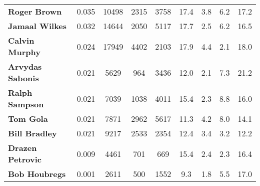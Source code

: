\documentclass[paper=a4, fontsize=11pt]{scrartcl} %
\numberwithin{equation}{section} %
\numberwithin{figure}{section} %
\numberwithin{table}{section} %
\begin{document}
\begin{table}[thb]
\begin{tabular}{l*{7}{c}r}
\textbf{Roger Brown} & 0.035 & 10498 & 2315 & 3758 & 17.4 & 3.8 & 6.2 & 17.2 \\
\textbf{Jamaal Wilkes} & 0.032 & 14644 & 2050 & 5117 & 17.7 & 2.5 & 6.2 & 16.5 \\
\textbf{Calvin Murphy} & 0.024 & 17949 & 4402 & 2103 & 17.9 & 4.4 & 2.1 & 18.0 \\
\textbf{Arvydas Sabonis} & 0.021 & 5629 & 964 & 3436 & 12.0 & 2.1 & 7.3 & 21.2 \\
\textbf{Ralph Sampson} & 0.021 & 7039 & 1038 & 4011 & 15.4 & 2.3 & 8.8 & 16.0 \\
\textbf{Tom Gola} & 0.021 & 7871 & 2962 & 5617 & 11.3 & 4.2 & 8.0 & 14.1 \\
\textbf{Bill Bradley} & 0.021 & 9217 & 2533 & 2354 & 12.4 & 3.4 & 3.2 & 12.2 \\
\textbf{Drazen Petrovic} & 0.009 & 4461 & 701 & 669 & 15.4 & 2.4 & 2.3 & 16.4 \\
\textbf{Bob Houbregs} & 0.001 & 2611 & 500 & 1552 & 9.3 & 1.8 & 5.5 & 17.0 \\
\end{tabular}
\end{table}
\end{document}
